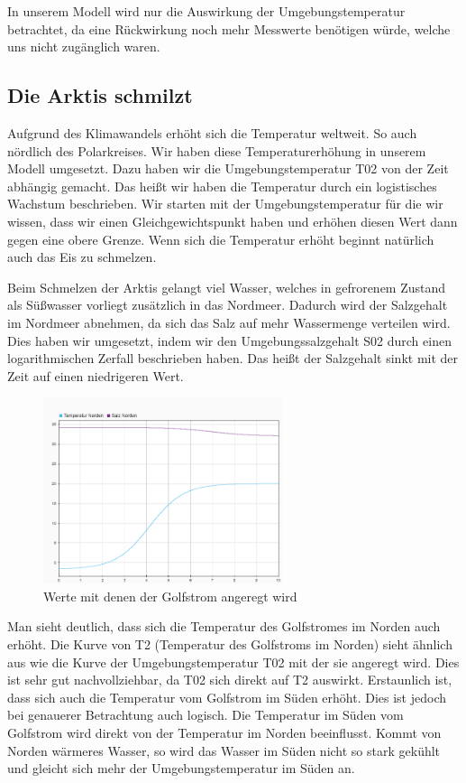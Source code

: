 \documentclass[a4paper,twoside]{article}
\begin{document}
	In unserem Modell wird nur die Auswirkung der Umgebungstemperatur betrachtet, da eine Rückwirkung noch mehr Messwerte benötigen würde, welche uns nicht zugänglich waren.  
	

	\subsection{Die Arktis schmilzt} \label{dieArktisSchmilzt}
	
	Aufgrund des Klimawandels erhöht sich die Temperatur weltweit. So auch nördlich des Polarkreises. Wir haben diese Temperaturerhöhung in unserem Modell umgesetzt. Dazu haben wir die Umgebungstemperatur T02 von der Zeit abhängig gemacht. Das heißt wir haben die Temperatur durch ein logistisches Wachstum beschrieben. Wir starten mit der Umgebungstemperatur für die wir wissen, dass wir einen Gleichgewichtspunkt haben und erhöhen diesen Wert dann gegen eine obere Grenze. Wenn sich die Temperatur erhöht beginnt natürlich auch das Eis zu schmelzen.
		
	Beim Schmelzen der Arktis gelangt viel Wasser, welches in gefrorenem Zustand als Süßwasser vorliegt zusätzlich in das Nordmeer. Dadurch wird der Salzgehalt im Nordmeer abnehmen, da sich das Salz auf mehr Wassermenge verteilen wird. Dies haben wir umgesetzt, indem wir den Umgebungssalzgehalt S02 durch einen logarithmischen Zerfall beschrieben haben. Das heißt der Salzgehalt sinkt mit der Zeit auf einen niedrigeren Wert. 
	
	\begin{figure}[!h]
  		\centering
 		\includegraphics[width=7cm]{../Diagramme/Arktis_schmilzt_init.png}
  		\caption{Werte mit denen der Golfstrom angeregt wird}
  		\label{fig:schmilztUmgebung}
	\end{figure}

	Man sieht deutlich, dass sich die Temperatur des Golfstromes im Norden auch erhöht. Die Kurve von T2 (Temperatur des Golfstroms im Norden) sieht ähnlich aus wie die Kurve der Umgebungstemperatur T02 mit der sie angeregt wird. Dies ist sehr gut nachvollziehbar, da T02 sich direkt auf T2 auswirkt. Erstaunlich ist, dass sich auch die Temperatur vom Golfstrom im Süden erhöht. Dies ist jedoch bei genauerer Betrachtung auch logisch. Die Temperatur im Süden vom Golfstrom wird direkt von der Temperatur im Norden beeinflusst. Kommt von Norden wärmeres Wasser, so wird das Wasser im Süden nicht so stark gekühlt und gleicht sich mehr der Umgebungstemperatur im Süden an.
	
\end{document}
